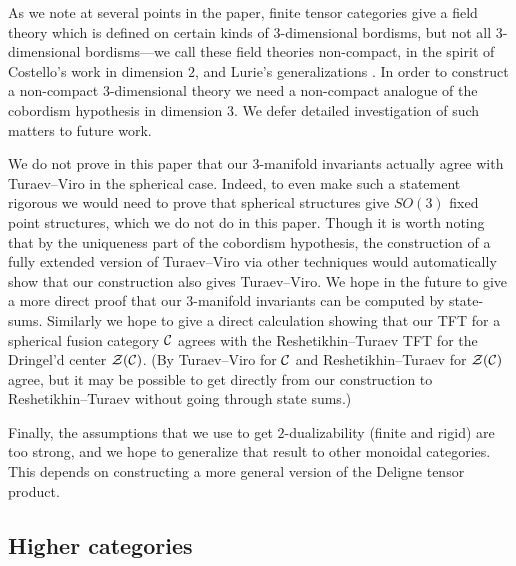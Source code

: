 \documentclass{amsart}
\begin{document}
As we note at several points in the paper, finite tensor categories give a field theory which is defined on certain kinds of $3$-dimensional bordisms, but not all $3$-dimensional bordisms---we call these field theories non-compact, in the spirit of Costello's work \cite{MR2298823} in dimension $2$, and Lurie's generalizations \cite[\S 4.2]{lurie-ch}.  In order to construct a non-compact $3$-dimensional theory we need a non-compact analogue of the cobordism hypothesis in dimension $3$.  We defer detailed investigation of such matters to future work.

We do not prove in this paper that our $3$-manifold invariants actually agree with Turaev--Viro in the spherical case.  Indeed, to even make such a statement rigorous we would need to prove that spherical structures give $SO(3)$ fixed point structures, which we do not do in this paper.  Though it is worth noting that by the uniqueness part of the cobordism hypothesis, the construction of a fully extended version of Turaev--Viro via other techniques would automatically show that our construction also gives Turaev--Viro.  We hope in the future to give a more direct proof that our $3$-manifold invariants can be computed by state-sums.  Similarly we hope to give a direct calculation showing that our TFT for a spherical fusion category $\mathcal C$ agrees with the Reshetikhin--Turaev TFT for the Dringel'd center $\mathcal Z(\mathcal C)$.  (By \cite{1006.3501} Turaev--Viro for $\mathcal C$ and Reshetikhin--Turaev for $\mathcal Z(\mathcal C)$ agree, but it may be possible to get directly from our construction to Reshetikhin--Turaev without going through state sums.)

Finally, the assumptions that we use to get $2$-dualizability (finite and rigid) are too strong, and we hope to generalize that result to other monoidal categories.  This depends on constructing a more general version of the Deligne tensor product.

\subsection*{Higher categories} 
\end{document}
